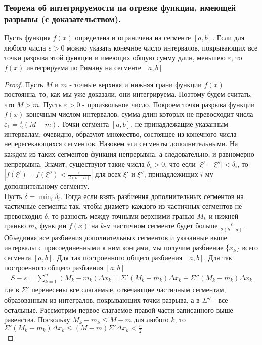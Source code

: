 \documentclass[10pt]{article}
\begin{document}
    \subsubsection{Теорема об интегрируемости на отрезке функции, имеющей разрывы (с доказательством).}
    \begin{theorem}
        Пусть функция $f(x)$ определена и ограничена на сегменте $[a, b]$. Если для любого числа $\varepsilon>0$ можно указать конечное число интервалов, покрывающих все точки разрыва этой функции и имеющих общую сумму длин, меньшею $\varepsilon$, то $f(x)$ интегрируема по Риману на сегменте $[a, b]$
    \end{theorem}
    \begin{proof}
        Пусть $M$ и $m$ - точные верхняя и нижняя грани функции $f(x)$ постоянна, то, как мы уже доказали, они интегрируема. Поэтому будем считать, что $M>m$. Пусть $\varepsilon > 0$ - произвольное число. Покроем точки разрыва функции $f(x)$ конечным числом интервалов, сумма длин которых не превосходит числа $\varepsilon_1 = \frac{\varepsilon}{2}(M-m)$. Точки сегмента $[a, b]$, не принадлежащие указанным интервалам, очевидно, образуют множество, состоящее из конечного числа непересекающихся сегментов. Назовем эти сегменты дополнительными. На каждом из таких сегментов функция непрерывна, а следовательно, и равномерно непрерывна. Значит, существуют такие числа $\delta_i > 0$, что если $|\xi' - \xi''| < \delta_i$, то $|f(\xi') - f(\xi'') < \frac{\varepsilon}{2(b-a)}|$ для всех $\xi'$ и $\xi''$, принадлежищих $i$-му дополнительному сегменту.\\
        Пусть $\delta = \min_i \delta_i$. Тогда если взять разбиения дополнительных сегментов на частичные сегменты так, чтобы диаметр каждого из частичных сегментов не превосходил $\delta$, то разность между точными верхними гранью $M_k$ и нижней гранью $m_k$ функции $f(x)$ на $k$-м частичном сегменте будет больше $\frac{\varepsilon}{2(b-a)}$. Объединяя все разбиения дополнительных сегментов и указанные выше интервалы с присоединенными к ним концами, мы получим разбиение $\{x_k\}$ всего сегмента $[a, b]$. Для так построенного общего разбиения $[a, b]$. Для так построенного общего разбиения $[a, b]$
        \begin{gather*}
            S-s=\sum_{k=1}^n (M_k-m_k)\Delta x_k = \Sigma' (M_k - m_k) \Delta x_k + \Sigma'' (M_k - m_k) \Delta x_k
        \end{gather*}
        где в $\Sigma'$ перенесены все слагаемые, отвечающие частичным сегментам, образованным из интегралов, покрывающих точки разрыва, а в $\Sigma''$ - все остальные. Рассмотрим первое слагаемое правой части записанного выше равенства. Поскольку $M_k - m_k \leq M - m$ для любого $k$, то $\Sigma' (M_k - m_k) \Delta x_k \leq (M-m) \Sigma' \Delta x_k < \frac{\varepsilon}{2}$\\

\end{proof}
\end{document}
